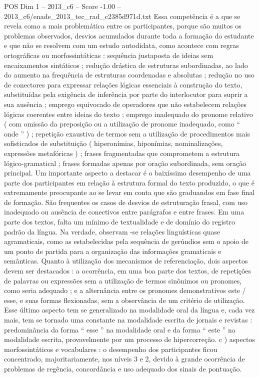 \begin{textsample}{POS Dim 1 – 2013\_c6 – Score -1.00 – 2013\_c6/enade\_2013\_tec\_rad\_c2385d971d.txt}
Essa competência é a que se revela como a mais problemática entre os participantes, porque são muitos os problemas observados, desvios acumulados durante toda a formação do estudante e que não se resolvem com um estudo autodidata, como acontece com regras ortográficas ou morfossintáticas : sequência justaposta de ideias sem encaixamentos sintáticos ; redução drástica de estruturas subordinadas, ao lado do aumento na frequência de estruturas coordenadas e absolutas ; redução no uso de conectores para expressar relações lógicas essenciais à construção do texto, substituídas pela exigência de inferência por parte do interlocutor para suprir a sua ausência ; emprego equivocado de operadores que não estabelecem relações lógicas coerentes entre ideias do texto ; emprego inadequado do pronome relativo ( com omissão da preposição ou a utilização de pronome inadequado, como “ onde ” ) ; repetição exaustiva de termos sem a utilização de procedimentos mais sofisticados de substituição ( hiperonímias, hiponímias, nominalizações, expressões metafóricas ) ; frases fragmentadas que comprometem a estrutura lógico-gramatical ; frases formadas apenas por oração subordinada, sem oração principal.
Um importante aspecto a destacar é o baixíssimo desempenho de uma parte dos participantes em relação à estrutura formal do texto produzido, o que é extremamente preocupante ao se levar em conta que são graduandos em fase final de formação.
São frequentes os casos de desvios de estruturação frasal, com uso inadequado ou ausência de conectivos entre parágrafos e entre frases.
Em uma parte dos textos, falta um mínimo de textualidade e de domínio do registro padrão da língua.
Na verdade, observam -se relações linguísticas quase agramaticais, como as estabelecidas pela sequência de gerúndios sem o apoio de um ponto de partida para a organização das informações gramaticais e semânticas.
Quanto à utilização dos mecanismos de referenciação, dois aspectos devem ser destacados : a ocorrência, em uma boa parte dos textos, de repetições de palavras ou expressões sem a utilização de termos sinônimos ou pronomes, como seria adequado ; e a alternância entre os pronomes demonstrativos este / esse, e suas formas flexionadas, sem a observância de um critério de utilização.
Esse último aspecto tem se generalizado na modalidade oral da língua e, cada vez mais, tem se tornado uma constante na modalidade escrita de jornais e revistas : predominância da forma “ esse ” na modalidade oral e da forma “ este ” na modalidade escrita, provavelmente por um processo de hipercorreção. c ) aspectos morfossintáticos e vocabulares : o desempenho dos participantes ficou concentrado, majoritariamente, nos níveis 3 e 2, devido à grande ocorrência de problemas de regência, concordância e uso adequado dos sinais de pontuação.

\end{textsample}
